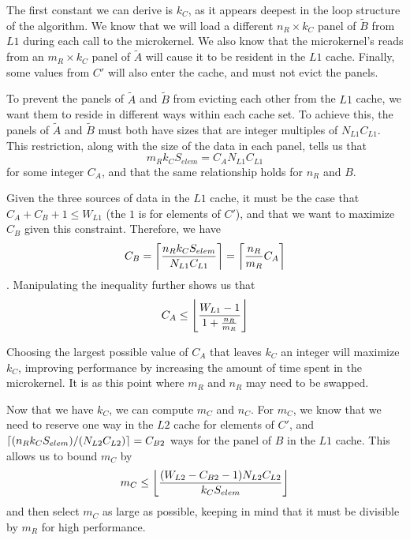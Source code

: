 \documentclass[12pt]{article}
\DeclarePairedDelimiter\ceil{\lceil}{\rceil}
\DeclarePairedDelimiter\floor{\lfloor}{\rfloor}
\begin{document}
The first constant we can derive is $k_C$, as it appears deepest in the loop structure of the algorithm.
We know that we will load a different $n_R \times k_C$ panel of $\tilde{B}$ from $L1$ during each call to the microkernel.
We also know that the microkernel's reads from an $m_R \times k_C$ panel of $\tilde{A}$ will cause it to be resident in the $L1$ cache.
Finally, some values from $C'$ will also enter the cache, and must not evict the panels.

To prevent the panels of $\tilde{A}$ and $\tilde{B}$ from evicting each other from the $L1$ cache, we want them to reside in different ways within each cache set.
To achieve this, the panels of $\tilde{A}$ and $\tilde{B}$ must both have sizes that are integer multiples of $N_{L1}C_{L1}$.
This restriction, along with the size of the data in each panel, tells us that
\begin{equation*}
  m_Rk_CS_{elem} = C_AN_{L1}C_{L1}
\end{equation*}
for some integer $C_A$, and that the same relationship holds for $n_R$ and $B$.

Given the three sources of data in the $L1$ cache, it must be the case that $C_A + C_B + 1 \leq W_{L1}$ (the $1$ is for elements of $C'$), and that we want to maximize $C_B$ given this constraint.
Therefore, we have
\begin{equation*}
  C_B = \ceil*{\frac{n_Rk_CS_{elem}}{N_{L1}C_{L1}}} = \ceil*{\frac{n_R}{m_R}C_A}
\end{equation*}.
Manipulating the inequality further shows us that
\begin{equation*}
  C_A \leq \floor*{\frac{W_{L1} - 1}{1 + \frac{n_R}{m_R}}}
\end{equation*}

Choosing the largest possible value of $C_A$ that leaves $k_C$ an integer will maximize $k_C$, improving performance by increasing the amount of time spent in the microkernel.
It is as this point where $m_R$ and $n_R$ may need to be swapped.

Now that we have $k_C$, we can compute $m_C$ and $n_C$.
For $m_C$, we know that we need to reserve one way in the $L2$ cache for elements of $C'$, and $\ceil*{(n_Rk_CS_{elem})/(N_{L2}C_{L2})} = C_{B2}$ ways for the panel of $B$ in the $L1$ cache.
This allows us to bound $m_C$ by
\begin{equation*}
  m_C \leq \floor*{\frac{(W_{L2} - C_{B2} - 1)N_{L2}C_{L2}}{k_CS_{elem}}}
\end{equation*}
and then select $m_C$ as large as possible, keeping in mind that it must be divisible by $m_R$ for high performance.
\end{document}
